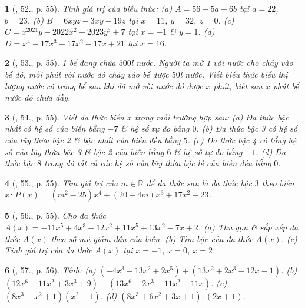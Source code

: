 \documentclass{article}
\newtheorem{baitoan}{}
\begin{document}
\begin{baitoan}[\cite{SBT_Toan_7_Canh_Dieu_tap_2}, 52., p. 55]
	Tính giá trị của biểu thức: (a) $A = 56 - 5a + 6b$ tại $a = 22$, $b = 23$. (b) $B = 6xyz - 3xy - 19z$ tại $x = 11$, $y = 32$, $z = 0$. (c) $C = x^{2021}y - 2022x^2 + 2023y^3 + 7$ tại $x = -1$ \& $y = 1$. (d) $D = x^4 - 17x^3 + 17x^2 - 17x + 21$ tại $x = 16$.
\end{baitoan}

\begin{baitoan}[\cite{SBT_Toan_7_Canh_Dieu_tap_2}, 53., p. 55]
	1 bể đang chứa $500$\emph{l} nước. Người ta mở 1 vòi nước cho chảy vào bể đó, mỗi phút vòi nước đó chảy vào bể được $50$\emph{l} nước. Viết biểu thức biểu thị lượng nước có trong bể sau khi đã mở vòi nước đó được $x$ phút, biết sau $x$ phút bể nước đó chưa đầy.
\end{baitoan}

\begin{baitoan}[\cite{SBT_Toan_7_Canh_Dieu_tap_2}, 54., p. 55]
	Viết đa thức biến $x$ trong mỗi trường hợp sau: (a) Đa thức bậc nhất có hệ số của biến bằng $-7$ \& hệ số tự do bằng $0$. (b) Đa thức bậc 3 có hệ số của lũy thừa bậc 2 \& bậc nhất của biến đều bằng $5$. (c) Đa thức bậc 4 có tổng hệ số của lũy thừa bậc 3 \& bậc 2 của biến bằng $6$ \& hệ số tự do bằng $-1$. (d) Đa thức bậc $8$ trong đó tất cả các hệ số của lũy thừa bậc lẻ của biến đều bằng $0$.
\end{baitoan}

\begin{baitoan}[\cite{SBT_Toan_7_Canh_Dieu_tap_2}, 55., p. 55]
	Tìm giá trị của $m\in\mathbb{R}$ để đa thức sau là đa thức bậc $3$ theo biến $x$: $P(x) = (m^2 - 25)x^4 + (20 + 4m)x^3 + 17x^2 - 23$.
\end{baitoan}

\begin{baitoan}[\cite{SBT_Toan_7_Canh_Dieu_tap_2}, 56., p. 55]
	Cho đa thức $A(x) = -11x^5 + 4x^3 - 12x^2 + 11x^5 + 13x^2 - 7x + 2$. (a) Thu gọn \& sắp xếp đa thức $A(x)$ theo số mũ giảm dần của biến. (b) Tìm bậc của đa thức $A(x)$. (c) Tính giá trị của đa thức $A(x)$ tại $x = -1$, $x = 0$, $x = 2$.
\end{baitoan}

\begin{baitoan}[\cite{SBT_Toan_7_Canh_Dieu_tap_2}, 57., p. 56]
	Tính: (a) $(-4x^3 - 13x^2 + 2x^5) + (13x^2 + 2x^3 - 12x - 1)$. (b) $(12x^6 - 11x^2 + 3x^3 + 9) - (13x^6 + 2x^3 - 11x^2 - 11x)$. (c) $(8x^3 - x^2 + 1)(x^2 - 1)$. (d) $(8x^3 + 6x^2 + 3x + 1):(2x + 1)$.
\end{baitoan}
\end{document}
